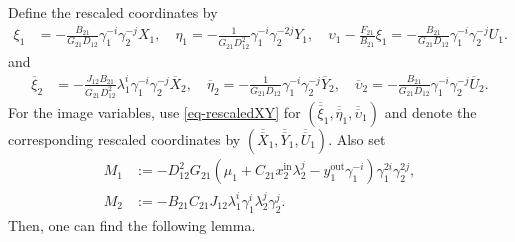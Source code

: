 \documentclass[11pt,a4paper]{article}
\theoremstyle{plain}
\theoremstyle{definition}
\theoremstyle{plain}
\numberwithin{equation}{section}
\begin{document}
Define the rescaled coordinates by
\begin{equation}
\label{eq-rescaledXY}
\begin{aligned}
\xi_1 &= -\frac{B_{21}}{G_{21}D_{12}}\gamma_1^{-i}\gamma_2^{-j} X_1,
\quad
\eta_1 = -\frac{1}{G_{21}D_{12}^2}\gamma_1^{-i}\gamma_2^{-2j} Y_1,
\quad
\upsilon_1 - \frac{F_{21}}{B_{21}}\xi_1 = -\frac{B_{21}}{G_{21}D_{12}}\gamma_1^{-i}\gamma_2^{-j} U_1.
\end{aligned}
\end{equation}
and
\begin{equation}
\label{eq-rescaledXY2}
\begin{aligned}
\overline{\xi}_2 &= -\frac{J_{12}B_{21}}{G_{21}D_{12}^2}\lambda_1^i\gamma_1^{-i}\gamma_2^{-j}\overline{X}_2,
\quad
\overline{\eta}_2 = -\frac{1}{G_{21}D_{12}}\gamma_1^{-i}\gamma_2^{-j}\overline{Y}_2,
\quad
\overline{\upsilon}_2 = -\frac{B_{21}}{G_{21}D_{12}}\gamma_1^{-i}\gamma_2^{-j}\overline{U}_2.
\end{aligned}
\end{equation}
For the image variables, use \eqref{eq-rescaledXY} for $(\overline{\overline{\xi}}_1,\overline{\overline{\eta}}_1,\overline{\overline{\upsilon}}_1)$ and denote the corresponding rescaled coordinates by $(\overline{\overline{X}}_1,\overline{\overline{Y}}_1,\overline{\overline{U}}_1)$. Also set
\begin{equation}
\label{eq-M1M2}
\begin{aligned}
M_1
&:=
-D_{12}^2 G_{21}
\left(
\mu_1
+
C_{21}x_2^\mathrm{in}\lambda_2^j
-
y_1^\mathrm{out}\gamma_1^{-i}
\right)
\gamma_1^{2i}\gamma_2^{2j},
\\
M_2
&:=
-B_{21}C_{21}J_{12}\lambda_1^i\gamma_1^i\lambda_2^j\gamma_2^j.
\end{aligned}
\end{equation}
Then, one can find the following lemma.
\end{document}
